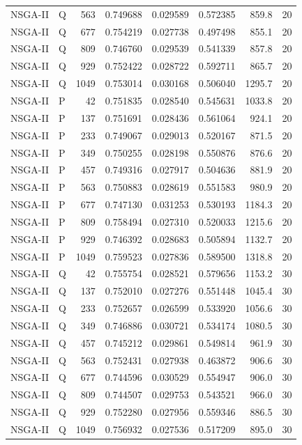 \begin{longtable}{llrrrrrr}
NSGA-II & Q & 563 & 0.749688 & 0.029589 & 0.572385 & 859.8 & 20 \\
NSGA-II & Q & 677 & 0.754219 & 0.027738 & 0.497498 & 855.1 & 20 \\
NSGA-II & Q & 809 & 0.746760 & 0.029539 & 0.541339 & 857.8 & 20 \\
NSGA-II & Q & 929 & 0.752422 & 0.028722 & 0.592711 & 865.7 & 20 \\
NSGA-II & Q & 1049 & 0.753014 & 0.030168 & 0.506040 & 1295.7 & 20 \\
NSGA-II & P & 42 & 0.751835 & 0.028540 & 0.545631 & 1033.8 & 20 \\
NSGA-II & P & 137 & 0.751691 & 0.028436 & 0.561064 & 924.1 & 20 \\
NSGA-II & P & 233 & 0.749067 & 0.029013 & 0.520167 & 871.5 & 20 \\
NSGA-II & P & 349 & 0.750255 & 0.028198 & 0.550876 & 876.6 & 20 \\
NSGA-II & P & 457 & 0.749316 & 0.027917 & 0.504636 & 881.9 & 20 \\
NSGA-II & P & 563 & 0.750883 & 0.028619 & 0.551583 & 980.9 & 20 \\
NSGA-II & P & 677 & 0.747130 & 0.031253 & 0.530193 & 1184.3 & 20 \\
NSGA-II & P & 809 & 0.758494 & 0.027310 & 0.520033 & 1215.6 & 20 \\
NSGA-II & P & 929 & 0.746392 & 0.028683 & 0.505894 & 1132.7 & 20 \\
NSGA-II & P & 1049 & 0.759523 & 0.027836 & 0.589500 & 1318.8 & 20 \\
NSGA-II & Q & 42 & 0.755754 & 0.028521 & 0.579656 & 1153.2 & 30 \\
NSGA-II & Q & 137 & 0.752010 & 0.027276 & 0.551448 & 1045.4 & 30 \\
NSGA-II & Q & 233 & 0.752657 & 0.026599 & 0.533920 & 1056.6 & 30 \\
NSGA-II & Q & 349 & 0.746886 & 0.030721 & 0.534174 & 1080.5 & 30 \\
NSGA-II & Q & 457 & 0.745212 & 0.029861 & 0.549814 & 961.9 & 30 \\
NSGA-II & Q & 563 & 0.752431 & 0.027938 & 0.463872 & 906.6 & 30 \\
NSGA-II & Q & 677 & 0.744596 & 0.030529 & 0.554947 & 906.0 & 30 \\
NSGA-II & Q & 809 & 0.744507 & 0.029753 & 0.543521 & 966.0 & 30 \\
NSGA-II & Q & 929 & 0.752280 & 0.027956 & 0.559346 & 886.5 & 30 \\
NSGA-II & Q & 1049 & 0.756932 & 0.027536 & 0.517209 & 895.0 & 30 \\

\end{longtable}
